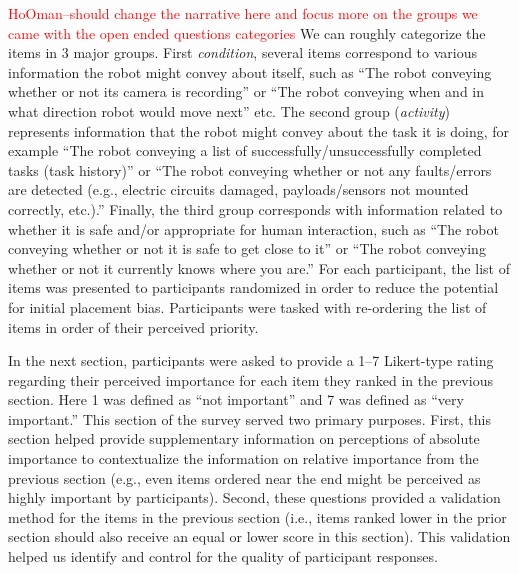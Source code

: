 \documentclass[letterpaper, 10 pt, conference]{ieeeconf}  %
\newcommand\hooman[1]{\textcolor{red}{HoOman--#1}}
\begin{document}
    \hooman{should change the narrative here and focus more on the groups we came with the open ended questions categories} We can roughly categorize the items in 3 major groups. First \textit{condition}\cite{cha2018survey}, several items correspond to various information the robot might convey about itself, such as ``The robot conveying whether or not its camera is recording'' or ``The robot conveying when and in what direction robot would move next'' etc. The second group (\textit{activity}\cite{cha2018survey}) represents information that the robot might convey about the task it is doing, for example ``The robot conveying a list of successfully/unsuccessfully completed tasks (task history)'' or ``The robot conveying whether or not any faults/errors are detected (e.g., electric circuits damaged, payloads/sensors not mounted correctly, etc.).'' Finally, the third group corresponds with information related to whether it is safe and/or appropriate for human interaction, such as ``The robot conveying whether or not it is safe to get close to it'' or ``The robot conveying whether or not it currently knows where you are.'' For each participant, the list of items was presented to participants randomized in order to reduce the potential for initial placement bias. Participants were tasked with re-ordering the list of items in order of their perceived priority. 
    
    In the next section, participants were asked to provide a 1--7 Likert-type rating regarding their perceived importance for each item they ranked in the previous section. Here 1 was defined as ``not important'' and 7 was defined as ``very important.'' This section of the survey served two primary purposes. First, this section helped provide supplementary information on perceptions of absolute importance to contextualize the information on relative importance from the previous section (e.g., even items ordered near the end might be perceived as highly important by participants). Second, these questions provided a validation method for the items in the previous section (i.e., items ranked lower in the prior section should also receive an equal or lower score in this section). This validation helped us identify and control for the quality of participant responses. %
\end{document}
